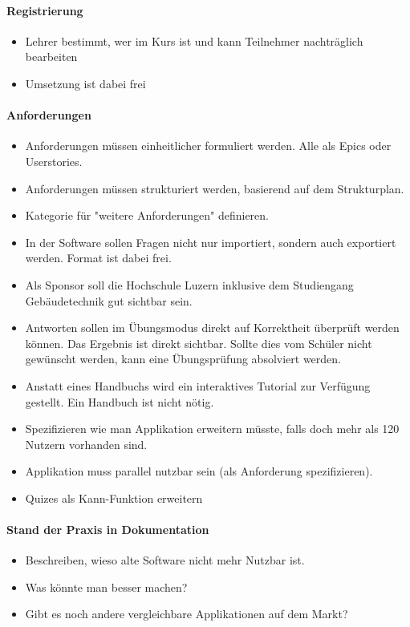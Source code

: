 \paragraph{Registrierung}
\begin{itemize}
    \item Lehrer bestimmt, wer im Kurs ist und kann Teilnehmer nachträglich bearbeiten
    \item Umsetzung ist dabei frei
\end{itemize}
\paragraph{Anforderungen}
\begin{itemize}
	
	\item Anforderungen müssen einheitlicher formuliert werden. Alle als Epics oder Userstories.
	\item Anforderungen müssen strukturiert werden, basierend auf dem Strukturplan.
    \item Kategorie für "weitere Anforderungen" definieren. 
    \item In der Software sollen Fragen nicht nur importiert, sondern auch exportiert werden. Format ist dabei frei.
    \item Als Sponsor soll die Hochschule Luzern inklusive dem Studiengang Gebäudetechnik gut sichtbar sein.
    \item Antworten sollen im Übungsmodus direkt auf Korrektheit überprüft werden können. Das Ergebnis ist direkt sichtbar. Sollte dies vom Schüler nicht gewünscht werden, kann eine Übungsprüfung absolviert werden.
    \item Anstatt eines Handbuchs wird ein interaktives Tutorial zur Verfügung gestellt. Ein Handbuch ist nicht nötig.
	\item Spezifizieren wie man Applikation erweitern müsste, falls doch mehr als 120 Nutzern vorhanden sind. 
    \item Applikation muss parallel nutzbar sein (als Anforderung spezifizieren).
    \item Quizes als Kann-Funktion erweitern
 
 \end{itemize}
\paragraph{Stand der Praxis in Dokumentation}
	\begin{itemize}
		\item Beschreiben, wieso alte Software nicht mehr Nutzbar ist.
		\item Was könnte man besser machen?
		\item Gibt es noch andere vergleichbare Applikationen auf dem Markt?
	\end{itemize}
